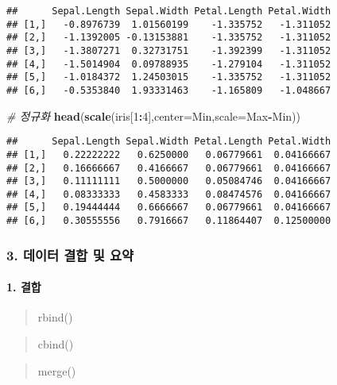 \documentclass[
]{article}
\newenvironment{Shaded}{\begin{snugshade}}{\end{snugshade}}
\newcommand{\AttributeTok}[1]{\textcolor[rgb]{0.13,0.29,0.53}{#1}}
\newcommand{\CommentTok}[1]{\textcolor[rgb]{0.56,0.35,0.01}{\textit{#1}}}
\newcommand{\DecValTok}[1]{\textcolor[rgb]{0.00,0.00,0.81}{#1}}
\newcommand{\FunctionTok}[1]{\textcolor[rgb]{0.13,0.29,0.53}{\textbf{#1}}}
\newcommand{\NormalTok}[1]{#1}
\newcommand{\SpecialCharTok}[1]{\textcolor[rgb]{0.81,0.36,0.00}{\textbf{#1}}}
\begin{document}
\begin{verbatim}
##      Sepal.Length Sepal.Width Petal.Length Petal.Width
## [1,]   -0.8976739  1.01560199    -1.335752   -1.311052
## [2,]   -1.1392005 -0.13153881    -1.335752   -1.311052
## [3,]   -1.3807271  0.32731751    -1.392399   -1.311052
## [4,]   -1.5014904  0.09788935    -1.279104   -1.311052
## [5,]   -1.0184372  1.24503015    -1.335752   -1.311052
## [6,]   -0.5353840  1.93331463    -1.165809   -1.048667
\end{verbatim}

\begin{Shaded}
\begin{Highlighting}[]
\CommentTok{\# 정규화}
\FunctionTok{head}\NormalTok{(}\FunctionTok{scale}\NormalTok{(iris[}\DecValTok{1}\SpecialCharTok{:}\DecValTok{4}\NormalTok{],}\AttributeTok{center=}\NormalTok{Min,}\AttributeTok{scale=}\NormalTok{Max}\SpecialCharTok{{-}}\NormalTok{Min))}
\end{Highlighting}
\end{Shaded}

\begin{verbatim}
##      Sepal.Length Sepal.Width Petal.Length Petal.Width
## [1,]   0.22222222   0.6250000   0.06779661  0.04166667
## [2,]   0.16666667   0.4166667   0.06779661  0.04166667
## [3,]   0.11111111   0.5000000   0.05084746  0.04166667
## [4,]   0.08333333   0.4583333   0.08474576  0.04166667
## [5,]   0.19444444   0.6666667   0.06779661  0.04166667
## [6,]   0.30555556   0.7916667   0.11864407  0.12500000
\end{verbatim}

\hypertarget{uxb370uxc774uxd130-uxacb0uxd569-uxbc0f-uxc694uxc57d}{%
\subsubsection{3. 데이터 결합 및
요약}\label{uxb370uxc774uxd130-uxacb0uxd569-uxbc0f-uxc694uxc57d}}

\hypertarget{uxacb0uxd569}{%
\paragraph{1. 결합}\label{uxacb0uxd569}}

\begin{quote}
rbind()
\end{quote}

\begin{quote}
cbind()
\end{quote}

\begin{quote}
merge()
\end{quote}
\end{document}
